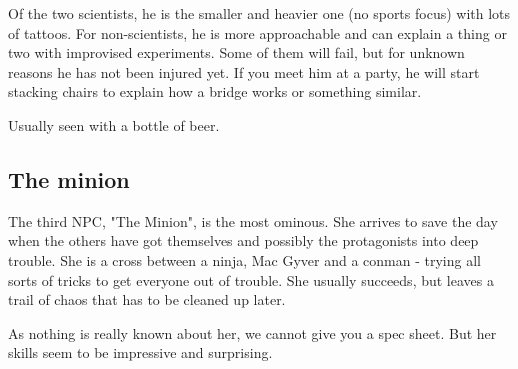 \begin{npcBox}[title=R*]
    \begin{consequences}
    \item {}
    \item {}
    \item {}
    \end{consequences}

    \begin{npcDescription}
    Of the two scientists, he is the smaller and heavier one (no sports focus) with lots of tattoos. For non-scientists, he is more approachable and can explain a thing or two with improvised experiments. Some of them will fail, but for unknown reasons he has not been injured yet.
    If you meet him at a party, he will start stacking chairs to explain how a bridge works or something similar.

    Usually seen with a bottle of beer.
    \end{npcDescription}

\end{npcBox}

\subsection{The minion}

The third NPC, "The Minion", is the most ominous. She arrives to save the day when the others have got themselves and possibly the protagonists into deep trouble. She is a cross between a ninja, Mac Gyver and a conman - trying all sorts of tricks to get everyone out of trouble. She usually succeeds, but leaves a trail of chaos that has to be cleaned up later.

As nothing is really known about her, we cannot give you a spec sheet. But her skills seem to be impressive and surprising.